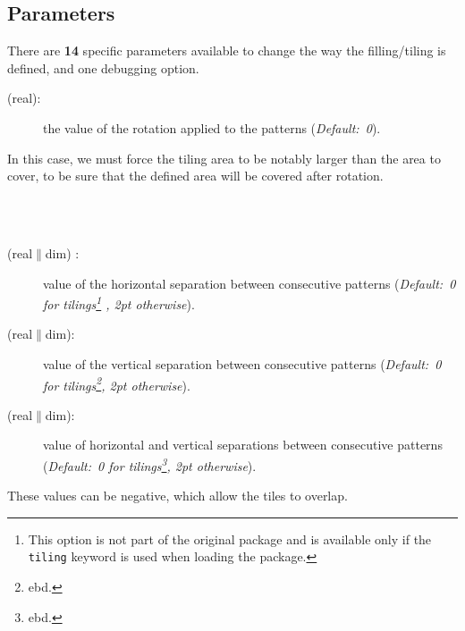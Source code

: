 \documentclass[fontsize=11pt,english,BCOR=10mm,DIV=12,bibliography=totoc,parskip=false,
   headings=small, headinclude=false,footinclude=false,oneside]{pst-doc}
\begin{document}
\subsection{Parameters}
%
 There are \textbf{14} specific parameters available to change the way the
filling/tiling is defined, and one debugging option.
%
\begin{description}
 \item [ (real)\hfill :] the value of the rotation
 applied to the patterns (\emph{Default:~0}).
\end{description}
%
\pstFillSetDefaults
%
  In this case, we must force the tiling area to be notably larger than the
area to cover, to be sure that the defined area will be covered after rotation.
\begin{LTXexample}[width=4cm,pos=l]
\newcommand\Cross{\begin{pspicture}(1,1)
  \psline[linecolor=red,dimen=middle](0,0.5)(1,0.5)
  \psline[linecolor=blue,dimen=middle](0.5,0)(0.5,1) 
\end{pspicture}}
\psboxfill{\Cross}
 \\[2pt]
\\[2pt]
\end{LTXexample}


\begin{description}
  \item[ (real$\|$dim) :] value of the horizontal
  separation between consecutive patterns (\emph{Default:~0 for
  tilings\footnote{This option is not part of the original package 
  and is available only if the
  \texttt{tiling} keyword is used when loading the package.} , 2pt otherwise}). 
  \item [ (real$\|$dim)\hfill :] value of the vertical
  separation between consecutive patterns (\emph{Default:~0 for
  ti\-lings\footnote{ebd.}, 2pt otherwise}).
  \item [ (real$\|$dim)\hfill :] value of horizontal and
  vertical separations between consecutive patterns (\emph{Default:~0 for
  tilings\footnote{ebd.}, 2pt otherwise}).
\end{description}

  These values can be negative, which allow the tiles to overlap.

\begin{LTXexample}[width=\linewidth]
\psboxfill{\Square}
 \quad
{} \quad
{}  \quad
{}
\end{LTXexample}
\end{document}
